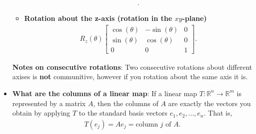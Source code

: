 \documentclass{report}
\begin{document}
\begin{itemize}
\begin{itemize}
\begin{align*}
                    .\end{align*}
                \item \textbf{Rotation about the z-axis (rotation in the $xy$-plane)}
                    \begin{align*}
                        R_{z}(\theta ) \begin{bmatrix} \cos{\left(\theta \right)} & -\sin{\left(\theta \right)} & 0 \\ \sin{\left(\theta \right)} & \cos{\left(\theta \right)} & 0 \\ 0 & 0 & 1\end{bmatrix}
                    .\end{align*}
            \end{itemize}
            \bigbreak \noindent 
            \textbf{Notes on consecutive rotations}: Two consecutive rotations about different axises is \textbf{not} communitive, however if you rotation about the same axis it is.
        \item \textbf{What are the columns of a linear map}: If a linear map \(T: \mathbb{R}^n \to \mathbb{R}^m\) is represented by a matrix \(A\), then the columns of \(A\) are exactly the vectors you obtain by applying \(T\) to the standard basis vectors \(e_1, e_2, \dots, e_n\). That is, 
            \begin{align*}
                T(e_j) = A e_j = \text{column } j \text{ of } A.
            \end{align*}
    \end{itemize}
\end{document}
